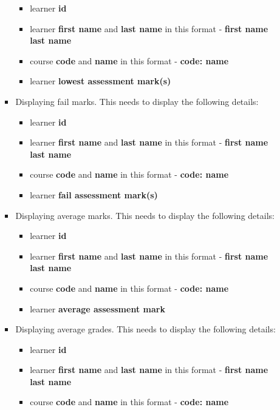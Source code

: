 \documentclass{article}
\begin{document}
\begin{itemize}
\begin{itemize}
\begin{itemize}
            \begin{itemize}
                \item learner \textbf{id}
                \item learner \textbf{first name} and \textbf{last name} in this format - \textbf{first name last name}
                \item course \textbf{code} and \textbf{name} in this format - \textbf{code: name}
                \item learner \textbf{lowest assessment mark(s)}
            \end{itemize}
            \item Displaying fail marks. This needs to display the following details:
            \begin{itemize}
                \item learner \textbf{id}
                \item learner \textbf{first name} and \textbf{last name} in this format - \textbf{first name last name}
                \item course \textbf{code} and \textbf{name} in this format - \textbf{code: name}
                \item learner \textbf{fail assessment mark(s)}
            \end{itemize}
            \item Displaying average marks. This needs to display the following details:
            \begin{itemize}
                \item learner \textbf{id}
                \item learner \textbf{first name} and \textbf{last name} in this format - \textbf{first name last name}
                \item course \textbf{code} and \textbf{name} in this format - \textbf{code: name}
                \item learner \textbf{average assessment mark}
            \end{itemize}
            \item Displaying average grades. This needs to display the following details:
            \begin{itemize}
                \item learner \textbf{id}
                \item learner \textbf{first name} and \textbf{last name} in this format - \textbf{first name last name}
                \item course \textbf{code} and \textbf{name} in this format - \textbf{code: name}

\end{itemize}
\end{itemize}
\end{itemize}
\end{itemize}
\end{document}
